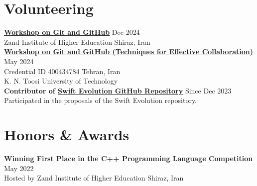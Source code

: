 \documentclass[letter,10pt]{article}
\begin{document}
\section*{Volunteering}
\href{https://github.com/karami-mehdi/CV/blob/main/Assets/certificate-of-workshop-participation-karami-mehdi-zand-ihe.pdf}{\underline{\textbf{Workshop on Git and GitHub}}} \hfill Dec 2024 \\ [2pt]
Zand Institute of Higher Education \hfill Shiraz, Iran \\ [5pt]
\href{https://github.com/karami-mehdi/CV/blob/main/Assets/certificate-of-workshop-participation-karami-mehdi.pdf}{\underline{\textbf{Workshop on Git and GitHub (Techniques for Effective Collaboration)}}} \hfill May 2024 \\ [2pt]
Credential ID 400434784 \hfill Tehran, Iran \\ 
K. N. Toosi University of Technology \\ [5pt]
\textbf{Contributor of \href{https://github.com/swiftlang/swift-evolution}{\underline{\textbf{Swift Evolution GitHub Repository}}}} \hfill Since Dec 2023 \\ [2pt]
Participated in the proposals of the Swift Evolution repository.

\section*{Honors \& Awards}
\noindent
\textbf{Winning First Place in the C++ Programming Language Competition} \hfill May 2022 \\
Hosted by Zand Institute of Higher Education \hfill Shiraz, Iran

\end{document}
